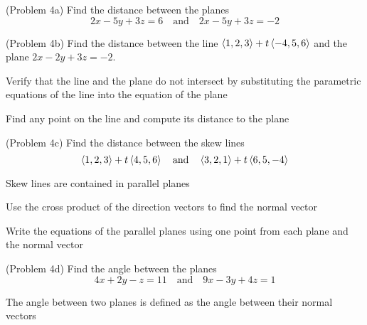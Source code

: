 \documentclass[handout]{ximera}
\begin{document}
\begin{problem}(Problem 4a)
Find the distance between the planes 
\[
2x -5y + 3z = 6 \quad \text{and} \quad 2x-5y+3z = -2
\]
\end{problem}

\begin{problem}(Problem 4b)
Find the distance between the line $\left\langle 1, 2, 3\right\rangle + t\left\langle -4, 5, 6\right\rangle$ and the plane $2x-2y+3z = -2$.\\
\begin{hint}
Verify that the line and the plane do not intersect by substituting the parametric equations 
of the line into the equation of the plane
\end{hint}
\begin{hint}
Find any point on the line and compute its distance to the plane
\end{hint}
\end{problem}

\begin{problem}(Problem 4c)
Find the distance between the skew lines 
\[
\left\langle 1, 2, 3\right\rangle + t\left\langle 4, 5, 6\right\rangle\quad \text{and} \quad \left\langle 3, 2, 1\right\rangle + t\left\langle 6, 5, -4\right\rangle
\]
\begin{hint}
Skew lines are contained in parallel planes
\end{hint}
\begin{hint}
Use the cross product of the direction vectors to find the normal vector
\end{hint}
\begin{hint}
Write the equations of the parallel planes using one point from each plane and the normal vector
\end{hint}
\end{problem}

\begin{problem}(Problem 4d)
Find the angle between the planes
\[
4x + 2y - z = 11 \quad \text{and} \quad 9x - 3y + 4z = 1
\]
\begin{hint}
The angle between two planes is defined as the angle between their normal vectors
\end{hint}
\end{problem}
\end{document}

